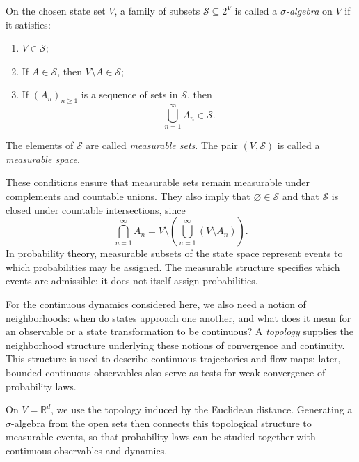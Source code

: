 \documentclass[12pt,a4paper,oneside]{book}
\begin{document}
\begin{definition}
On the chosen state set $V$, a family of subsets $\mathcal S\subseteq 2^V$ is called a \emph{$\sigma$-algebra} on $V$ if
it satisfies:
\begin{enumerate}
    \item $V\in\mathcal S$;
    \item If $A\in\mathcal S$, then $V\setminus A\in\mathcal S$;
    \item If $(A_n)_{n\geq 1}$ is a sequence of sets in $\mathcal S$, then
        \begin{equation*}
            \bigcup_{n=1}^{\infty}A_n\in\mathcal S.
        \end{equation*}
\end{enumerate}
The elements of $\mathcal S$ are called \emph{measurable sets}. The pair $(V,\mathcal S)$ is called a \emph{measurable space}.
\end{definition}

These conditions ensure that measurable sets remain measurable under complements and countable unions. They also imply that
$\varnothing\in\mathcal S$ and that $\mathcal S$ is closed under countable intersections, since
\begin{equation*}
\bigcap_{n=1}^{\infty}A_n = V\setminus
    \left(
        \bigcup_{n=1}^{\infty}(V\setminus A_n)
    \right).
\end{equation*}
In probability theory, measurable subsets of the state space represent events to which probabilities may be assigned.
The measurable structure specifies which events are admissible; it does not itself assign probabilities.

For the continuous dynamics considered here, we also need a notion of neighborhoods: when do states approach one another,
and what does it mean for an observable or a state transformation to be continuous? A \emph{topology} supplies the neighborhood
structure underlying these notions of convergence and continuity. This structure is used to describe continuous trajectories
and flow maps; later, bounded continuous observables also serve as tests for weak convergence of probability laws.

On $V=\mathbb R^d$, we use the topology induced by the Euclidean distance. Generating a $\sigma$-algebra from the open sets
then connects this topological structure to measurable events, so that probability laws can be studied together with continuous
observables and dynamics.
\end{document}

